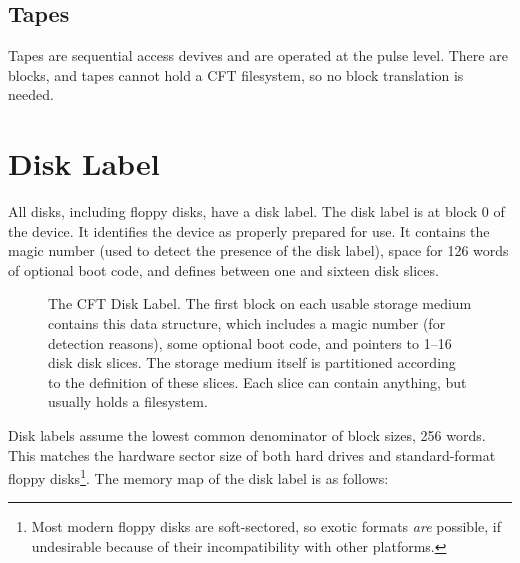 \subsection{Tapes}

Tapes are sequential access devives and are operated at the pulse level. There
are blocks, and tapes cannot hold a CFT filesystem, so no block translation is
needed.

\section{Disk Label}
\label{sec:disk-label}
\label{sec:disklabel}
\label{sec:disk-slices}

All disks, including floppy disks, have a \gls{disk label}. The disk
label is at block 0 of the device. It identifies the device as
properly prepared for use. It contains the magic number
\magicDiskLabel (used to detect the presence of the disk label), space
for 126 words of optional boot code, and defines between one and
sixteen \glspl{disk slice}.

\begin{figure}
 \centering

 \caption[Disk Label]{\label{fig:storage-medium-organisation} The CFT
   Disk Label. The first block on each usable storage medium contains
   this data structure, which includes a magic number (for detection
   reasons), some optional boot code, and pointers to 1–16 disk
   \glspl{disk slice}. The storage medium itself is partitioned
   according to the definition of these slices. Each slice can contain
   anything, but usually holds a \gls{filesystem}.}
\end{figure}

Disk labels assume the lowest common denominator of block sizes, 256
words. This matches the hardware sector size of both hard drives and
standard-format floppy disks\footnote{Most modern floppy disks are
  soft-sectored, so exotic formats {\em are\/} possible, if undesirable
  because of their incompatibility with other platforms.}. The memory
map of the disk label is as follows:

